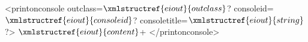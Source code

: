 <printonconsole outclass=$\xmlstructref{eiout}{outclass}$? consoleid=$\xmlstructref{eiout}{consoleid}$? consoletitle=$\xmlstructref{eiout}{string}$?>
  $\xmlstructref{eiout}{content}$+
</printonconsole>
